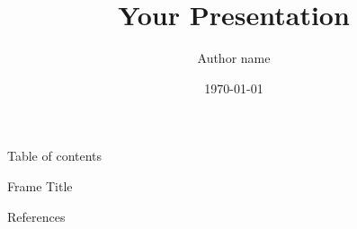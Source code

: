 \documentclass[aspectratio=1610]{beamer}
\title[Your Short Title]{Your Presentation}
\author[Author abbr.]{Author name}
\institute[Affiliation abbr.]{Affiliation}
\date{\today}
\begin{document}
\begin{frame} \titlepage \end{frame}
\begin{frame}[t, allowframebreaks]{Table of contents} \tableofcontents \end{frame}

\begin{frame}[t, allowframebreaks]{Frame Title}
    
\end{frame}

\begin{frame}[t, allowframebreaks]{References}
    
    
\end{frame}
\end{document}
